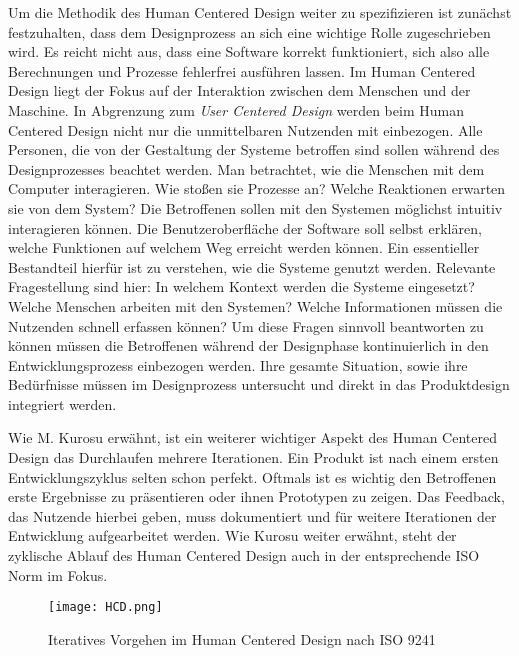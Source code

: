 Um die Methodik des Human Centered Design weiter zu spezifizieren ist zunächst
festzuhalten, dass dem Designprozess an sich eine wichtige Rolle zugeschrieben
wird. Es reicht nicht aus, dass eine Software korrekt funktioniert, sich also
alle Berechnungen und Prozesse fehlerfrei ausführen lassen. Im Human Centered
Design liegt der Fokus auf der Interaktion zwischen dem Menschen und der
Maschine. In Abgrenzung zum \textit{User Centered Design} werden beim Human
Centered Design nicht nur die unmittelbaren Nutzenden mit einbezogen. Alle
Personen, die von der Gestaltung der Systeme betroffen sind sollen während des
Designprozesses beachtet werden.\cite{sequenceDiagrams} Man betrachtet, wie die
Menschen mit dem Computer interagieren. Wie stoßen sie Prozesse an? Welche
Reaktionen erwarten sie von dem System? Die Betroffenen sollen mit den Systemen
möglichst intuitiv interagieren können. Die Benutzeroberfläche der Software
soll selbst erklären, welche Funktionen auf welchem Weg erreicht werden können.
Ein essentieller Bestandteil hierfür ist zu verstehen, wie die Systeme genutzt
werden. Relevante Fragestellung sind hier: In welchem Kontext werden die
Systeme eingesetzt? Welche Menschen arbeiten mit den Systemen? Welche
Informationen müssen die Nutzenden schnell erfassen können? Um diese Fragen
sinnvoll beantworten zu können müssen die Betroffenen während der Designphase
kontinuierlich in den Entwicklungsprozess einbezogen werden. Ihre gesamte
Situation, sowie ihre Bedürfnisse müssen im Designprozess untersucht und direkt
in das Produktdesign integriert werden.\cite{hci}

Wie M. Kurosu erwähnt, ist ein weiterer wichtiger Aspekt des Human Centered
Design das Durchlaufen mehrere Iterationen. Ein Produkt ist nach einem ersten
Entwicklungszyklus selten schon perfekt. Oftmals ist es wichtig den Betroffenen
erste Ergebnisse zu präsentieren oder ihnen Prototypen zu zeigen. Das Feedback,
das Nutzende hierbei geben, muss dokumentiert und für weitere Iterationen der
Entwicklung aufgearbeitet werden. Wie Kurosu weiter erwähnt, steht der
zyklische Ablauf des Human Centered Design auch in der entsprechende ISO Norm
im Fokus.\cite{kurosuHCI}

\begin{figure}[H]
    \caption{Iteratives Vorgehen im Human Centered Design nach ISO 9241 \cite{ISO9241Graphic}}
    \centering
    \texttt{[image: HCD.png]}
\end{figure}

